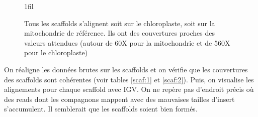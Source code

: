 \documentclass[a4paper]{article}
\makeatletter
\newcommand*{\centerfloat}{%
  \parindent \z@
  \leftskip \z@ \@plus 1fil \@minus \textwidth
  \rightskip\leftskip
  \parfillskip \z@skip}
\makeatother
\begin{document}
\begin{figure}[H]
\centerfloat

 \hspace{5mm}

\label{scaf}
\caption{Tous les scaffolds s'alignent soit sur le chloroplaste, soit sur la mitochondrie de référence. Ils ont des couvertures proches des valeurs attendues (autour de 60X pour la mitochondrie et de 560X pour le chloroplaste)}
\end{figure}

On réaligne les données brutes sur les scaffolds et on vérifie que les couvertures des scaffolds sont cohérentes (voir tables \ref{scaf:1} et \ref{scaf:2}). Puis, on visualise les alignements pour chaque scaffold avec IGV. On ne repère pas d'endroit précis où des reads dont les compagnons mappent avec des mauvaises tailles d'insert s'accumulent. Il semblerait que les scaffolds soient bien formés. 

\end{document}
